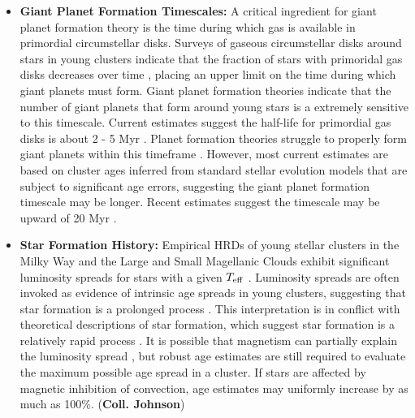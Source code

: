 \begin{itemize}
	\item {\bf Giant Planet Formation Timescales:} A critical ingredient for giant planet formation theory is the time during which gas is available in primordial circumstellar disks. Surveys of gaseous circumstellar disks around stars in young clusters indicate that the fraction of stars with primoridal gas disks decreases over time \citep{Haisch2001, Mamajek2009}, placing an upper limit on the time during which giant planets must form. Giant planet formation theories indicate that the number of giant planets that form around young stars is a extremely sensitive to this timescale. Current estimates suggest the half-life for primordial gas disks is about 2 - 5 Myr \citep[e.g.,][]{Mamajek2009}. Planet formation theories struggle to properly form giant planets within this timeframe \citep{}. However, most current estimates are based on cluster ages inferred from standard stellar evolution models that are subject to significant age errors, suggesting the giant planet formation timescale may be longer. Recent estimates suggest the timescale may be upward of 20 Myr \citep{Bell2013}. \\
	
	\item {\bf Star Formation History:} Empirical HRDs of young stellar clusters in the Milky Way and the Large and Small Magellanic Clouds exhibit significant luminosity spreads for stars with a given $T_{\rm eff}$ \citep[e.g.,][]{Hillenbrand1997, DaRio2010b, DaRio2010a}. Luminosity spreads are often invoked as evidence of intrinsic age spreads in young clusters, suggesting that star formation is a prolonged process \citep{Hillenbrand1997}. This interpretation is in conflict with theoretical descriptions of star formation, which suggest star formation is a relatively rapid process \citep{Elmegreen2000}. It is possible that magnetism can partially explain the luminosity spread \citep[via starspots;][]{Somers2015b}, but robust age estimates are still required to evaluate the maximum possible age spread in a cluster. If stars are affected by magnetic inhibition of convection, age estimates may uniformly increase by as much as 100\%. ({\bf Coll. Johnson}) \\
	

\end{itemize}
